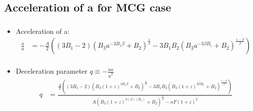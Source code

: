 \documentclass[8pt,hideothersubsections]{beamer}
\newcommand{\brac}[1]{\left(#1\right)}
\begin{document}
\subsection{Acceleration of a for MCG case}
\begin{frame}
\frametitle{\insertsectionhead}
\framesubtitle{\insertsubsectionhead}
\fontsize{8pt}{7.2}\selectfont
\begin{itemize}
\item Acceleration of a:
\fontsize{6pt}{7.2}\selectfont
\begin{equation}\label{eq:ChRaych}
\begin{split}
\frac{\ddot{a}}{a} &= -\frac{A}{2}\brac{\brac{3B_{1}-2}\brac{B_{3}a^{-3B_{1}\beta}+B_{2}}^{\frac{1}{\beta}}-3B_{1}B_{2}\brac{B_{3}a^{-3\beta B_{1}}+B_{2}}^{\frac{1-\beta}{\beta}}}\\
\end{split}
\end{equation}
\fontsize{8pt}{7.2}\selectfont
\item Deceleration parameter $q\equiv-\frac{\ddot{a}a}{\dot{a}^{2}}$
\fontsize{6pt}{7.2}\selectfont
\begin{equation}\label{eq:ChModDecelZ}
\begin{split}
q &= \frac{\frac{A}{2}\brac{\brac{3B_{1}-2}\brac{B_{3}\brac{1+z}^{3B_{1}\beta}+B_{2}}^{\frac{1}{\beta}}-3B_{1}B_{2}\brac{B_{3}\brac{1+z}^{3\beta B_{1}}+B_{2}}^{\frac{1-\beta}{\beta}}}}{A\brac{B_{3}\brac{1+z}^{3\brac{\beta}\brac{B_{1}}}+B_{2}}^{\frac{1}{\beta}} -\kappa F\brac{1+z}^{2}}
\end{split}
\end{equation}
\end{itemize}


\end{frame}
\end{document}
